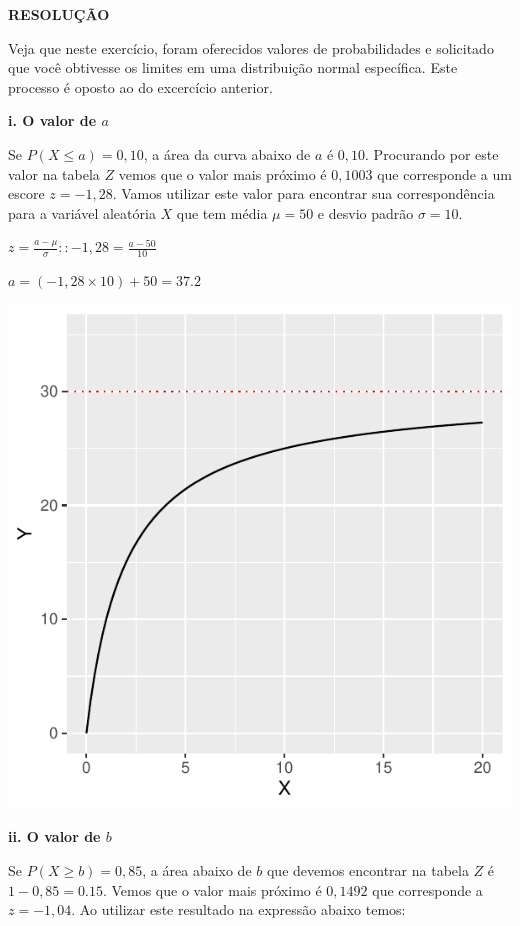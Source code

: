 \documentclass[
]{book}
\begin{document}
\textbf{RESOLUÇÃO}

Veja que neste exercício, foram oferecidos valores de probabilidades e solicitado que você obtivesse os limites em uma distribuição normal específica. Este processo é oposto ao do excercício anterior.

\textbf{i. O valor de \(a\)}

Se \(P(X \le a) = 0,10\), a área da curva abaixo de \(a\) é \(0,10\). Procurando por este valor na tabela \(Z\) vemos que o valor mais próximo é \(0,1003\) que corresponde a um escore \(z = -1,28\). Vamos utilizar este valor para encontrar sua correspondência para a variável aleatória \(X\) que tem média \(\mu = 50\) e desvio padrão \(\sigma = 10\).

\(z = \frac{a - \mu}{\sigma} :: -1,28 = \frac{a - 50}{10}\)

\(a = (-1,28 \times 10) + 50 = 37.2\)

\includegraphics{probest-cambientais_files/figure-latex/unnamed-chunk-217-1.pdf}

\textbf{ii. O valor de \(b\)}

Se \(P(X \ge b) = 0,85\), a área abaixo de \(b\) que devemos encontrar na tabela \(Z\) é \(1 - 0,85 = 0.15\). Vemos que o valor mais próximo é \(0,1492\) que corresponde a \(z = -1,04\). Ao utilizar este resultado na expressão abaixo temos:
\end{document}
